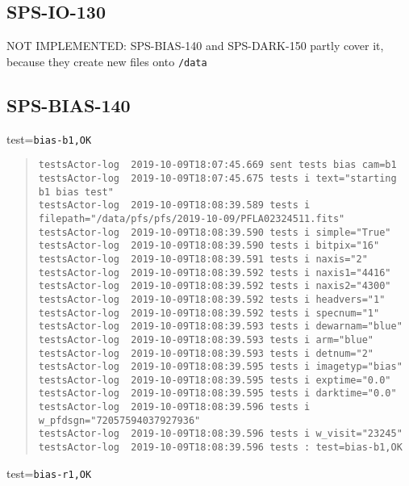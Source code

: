 \subsection{SPS-IO-130}
\label{sec:tc-130}
NOT IMPLEMENTED: SPS-BIAS-140 and SPS-DARK-150 partly cover it, because they create new files onto 
\texttt{/data}

\subsection{SPS-BIAS-140}
\label{sec:tc-140}

test=\texttt{bias-b1,OK}

\begin{quote}
\begin{tiny}
\begin{verbatim}
testsActor-log  2019-10-09T18:07:45.669 sent tests bias cam=b1
testsActor-log  2019-10-09T18:07:45.675 tests i text="starting b1 bias test"
testsActor-log  2019-10-09T18:08:39.589 tests i filepath="/data/pfs/pfs/2019-10-09/PFLA02324511.fits"
testsActor-log  2019-10-09T18:08:39.590 tests i simple="True"
testsActor-log  2019-10-09T18:08:39.590 tests i bitpix="16"
testsActor-log  2019-10-09T18:08:39.591 tests i naxis="2"
testsActor-log  2019-10-09T18:08:39.592 tests i naxis1="4416"
testsActor-log  2019-10-09T18:08:39.592 tests i naxis2="4300"
testsActor-log  2019-10-09T18:08:39.592 tests i headvers="1"
testsActor-log  2019-10-09T18:08:39.592 tests i specnum="1"
testsActor-log  2019-10-09T18:08:39.593 tests i dewarnam="blue"
testsActor-log  2019-10-09T18:08:39.593 tests i arm="blue"
testsActor-log  2019-10-09T18:08:39.593 tests i detnum="2"
testsActor-log  2019-10-09T18:08:39.595 tests i imagetyp="bias"
testsActor-log  2019-10-09T18:08:39.595 tests i exptime="0.0"
testsActor-log  2019-10-09T18:08:39.595 tests i darktime="0.0"
testsActor-log  2019-10-09T18:08:39.596 tests i w_pfdsgn="72057594037927936"
testsActor-log  2019-10-09T18:08:39.596 tests i w_visit="23245"
testsActor-log  2019-10-09T18:08:39.596 tests : test=bias-b1,OK
\end{verbatim}
\end{tiny}
\end{quote}

\noindent test=\texttt{bias-r1,OK}

